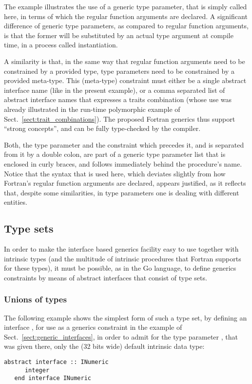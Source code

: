 \documentclass[11pt,oneside]{report}
\newcommand{\code}[1]{{\selectfont\ttfamily{#1}}}
\begin{document}
The example illustrates the use of a generic type parameter, that is
simply called \code{T} here, in terms of which the regular function
arguments are declared. A significant difference of generic type
parameters, as compared to regular function arguments, is that the
former will be substituted by an actual type argument at compile time,
in a process called instantiation.

A similarity is that, in the same way that regular function arguments
need to be constrained by a provided type, type parameters need to be
constrained by a provided meta-type. This (meta-type) constraint must
either be a single abstract interface name (like \code{INumeric} in
the present example), or a comma separated list of abstract interface
names that expresses a traits combination (whose use was already
illustrated in the run-time polymorphic example of
Sect.~\ref{sect:trait_combinations}). The proposed Fortran generics
thus support ``strong concepts'', and can be fully type-checked by the
compiler.

Both, the type parameter and the constraint which precedes it, and is
separated from it by a double colon, are part of a generic type
parameter list that is enclosed in curly braces, and follows
immediately behind the procedure's name. Notice that the syntax that
is used here, which deviates slightly from how Fortran's regular
function arguments are declared, appears justified, as it reflects
that, despite some similarities, in type parameters one is dealing
with different entities.

\subsection{Type sets}
\label{sect:type_sets}

In order to make the interface based generics facility easy to use
together with intrinsic types (and the multitude of intrinsic
procedures that Fortran supports for these types), it must be
possible, as in the Go language, to define generics constraints by
means of abstract interfaces that consist of type sets.

\subsubsection{Unions of types}

The following example shows the simplest form of such a type set, by
defining an interface \code{INumeric}, for use as a generics
constraint in the example of Sect.~\ref{sect:generic_interfaces}, in
order to admit for the type parameter \code{T}, that was given there,
only the (32 bits wide) default \code{integer} intrinsic data type:
\begin{lstlisting}[language=LFortran,style=boxed]
   abstract interface :: INumeric
      integer
   end interface INumeric
\end{lstlisting}
\end{document}
